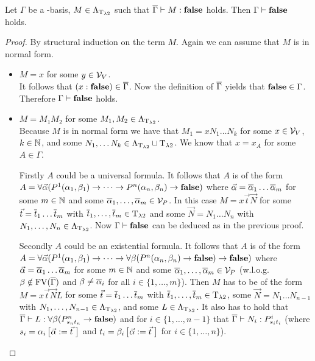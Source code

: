 \begin{lemma}\label{lem.4.4}
Let $\Gamma$ be a \SysP-basis, $M\in\Lambda_{\text{T}_{\lambda2}}$ such that $\overline{\Gamma}\vdash M:\textbf{false}$ holds. Then $\Gamma\vdash\textbf{false}$ holds.
\end{lemma}
\begin{proof}
By structural induction on the term $M$.
Again we can assume that $M$ is in normal form.
\begin{itemize}
	\item[] \underline{$M=x$} for some $y\in\mathcal{V}_V$.\\
		It follows that $(x:\textbf{false})\in\overline{\Gamma}$. Now the definition of $\overline{\Gamma}$ yields that $\textbf{false}\in\Gamma$. Therefore $\Gamma\vdash \textbf{false}$ holds.
	\item[] \underline{$M=M_1M_2$} for some $M_1,M_2\in\Lambda_{\text{T}_{\lambda2}}$.\\
		Because $M$ is in normal form we have that $M_1=xN_1\dots N_k$ for some $x\in\mathcal{V}_V$, $k\in\mathbb{N}$, and some $N_1,\dots N_k\in\Lambda_{\text{T}_{\lambda2}}\cup\text{T}_{\lambda2}$.
		We know that $x=x_A$ for some $A\in\Gamma$.
		
		Firstly $A$ could be a universal formula. It follows that $A$ is of the form $A=\forall\predVec(P^1(\predFst[1],\predSnd[1])\to\dots\to P^n(\predFst[n],\predSnd[n])\to\false)$ where $\predVec=\predVec[1]\dots\predVec[m]$ for some $m\in\mathbb{N}$ and some $\predVec[1],\dots,\predVec[m]\in\VarP$. In this case $M=x\vec{t}\vec{N}$ for some $\predTVec=\predTVec[1]\dots \predTVec[m]$ with $\predTVec[1],\dots,\predTVec[m]\in\lambdaTypes$ and some $\vec{N}=N_1\dots N_n$ with $N_1,\dots,N_n\in\Lambda_{\text{T}_{\lambda2}}$. Now $\Gamma\vdash\textbf{false}$ can be deduced as in the previous proof.
		
		Secondly $A$ could be an existential formula. It follows that $A$ is of the form $A=\forall\predVec(P^1(\predFst[1],\predSnd[1])\to\dots\to \forall\beta(P^n(\predFst[n],\predSnd[n])\to\false)\to \false)$ where $\predVec=\predVec[1]\dots\predVec[m]$ for some $m\in\mathbb{N}$ and some $\predVec[1],\dots,\predVec[m]\in\VarP$ (w.l.o.g. $\beta\notin\text{FV}(\overline{\Gamma})$ and $\beta\neq\predVec[i]$ for all $i\in\{1,\dots,m\}$).
		Then $M$ has to be of the form $M=x\vec{t}\vec{N}L$ for some $\predTVec=\predTVec[1]\dots \predTVec[m]$ with $\predTVec[1],\dots,\predTVec[m]\in\lambdaTypes$, some $\vec{N}=N_1\dots N_{n-1}$ with $N_1,\dots,N_{n-1}\in\Lambda_{\text{T}_{\lambda2}}$, and some $L\in\Lambda_{\text{T}_{\lambda2}}$. It also has to hold that $\trans{\Gamma}\lambdaModels L:\forall\beta(\code{P^n}{\predTFst[n]}{\predTSnd[n]}\to\false)$ and for $i\in\{1,\dots,n-1\}$ that $\trans{\Gamma}\lambdaModels N_i:\code{P^i}{\predTFst[i]}{\predTSnd[i]}$ (where $\predTFst[i]=\predFst[i]\left[\predVec:=\predTVec\hspace{1mm}\right]$ and  $\predTSnd[i]=\predSnd[i]\left[\predVec:=\predTVec\hspace{1mm}\right]$ for $i\in\{1,\dots,n\}$).
		

\end{itemize}
\end{proof}
